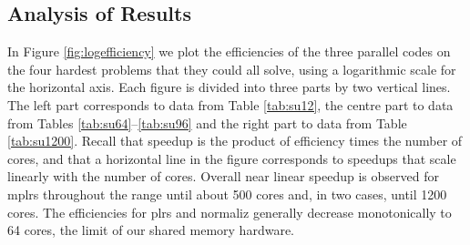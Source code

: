 \documentclass[a4paper,11pt]{article}   \usepackage{authblk} \usepackage[top=1.9cm,bottom=1.9cm,left=1.9cm,right=1.9cm]{geometry}
\newcommand{\progname}{\textsf}
\newcommand{\plrs}{\progname{plrs}\xspace}
\newcommand{\mplrs}{\progname{mplrs}\xspace}
\newcommand{\norm}{\progname{normaliz}\xspace}
\begin{document}
\subsection{Analysis of Results}
\label{analysis}

In Figure \ref{fig:logefficiency} we plot the efficiencies of the three
parallel codes on the four hardest problems that they could all solve,
using a logarithmic scale for the horizontal axis.
Each figure is divided into three parts by two vertical lines.
The left part corresponds to data from Table \ref{tab:su12},
the centre part to data from Tables \ref{tab:su64}--\ref{tab:su96} and the right part to
data from Table \ref{tab:su1200}.
Recall that speedup is the product of efficiency times the number of cores, and that
a horizontal line in the figure corresponds to speedups that scale linearly with the
number of cores.
Overall near linear speedup is observed for \mplrs throughout the
range until about 500 cores and, in two cases,
until 1200 cores.
The efficiencies for \plrs and \norm generally decrease monotonically to
64 cores, the limit of our shared memory hardware.
\end{document}
